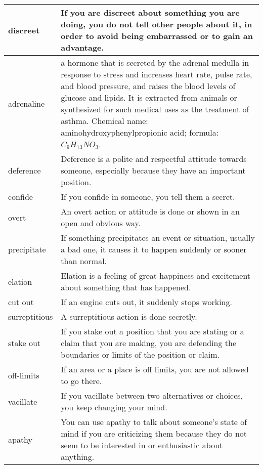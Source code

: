 \documentclass{article}
\begin{document}
\begin{center}
\begin{longtable}{|l|p{9cm}|}
\hline
discreet
&
If you are discreet about something you are doing, you do not tell other people about it, in order to avoid being embarrassed or to gain an advantage.
\\

\hline
adrenaline
&
a hormone that is secreted by the adrenal medulla in response to stress and increases heart rate, pulse rate, and blood pressure, and raises the blood levels of glucose and lipids. It is extracted from animals or synthesized for such medical uses as the treatment of asthma. Chemical name: aminohydroxyphenylpropionic acid; formula: $C_{9}H_{13}NO_{3}$.
\\

\hline
deference
&
Deference is a polite and respectful attitude towards someone, especially because they have an important position.
\\

\hline
confide
&
If you confide in someone, you tell them a secret.
\\

\hline
overt
&
An overt action or attitude is done or shown in an open and obvious way.
\\

\hline
precipitate
&
If something precipitates an event or situation, usually a bad one, it causes it to happen suddenly or sooner than normal.
\\

\hline
elation
&
Elation is a feeling of great happiness and excitement about something that has happened.
\\

\hline
cut out
&
If an engine cuts out, it suddenly stops working.
\\

\hline
surreptitious
&
A surreptitious action is done secretly.
\\

\hline
stake out
&
If you stake out a position that you are stating or a claim that you are making, you are defending the boundaries or limits of the position or claim.
\\

\hline
off-limits
&
If an area or a place is off limits, you are not allowed to go there.
\\

\hline
vacillate
&
If you vacillate between two alternatives or choices, you keep changing your mind.
\\

\hline
apathy
&
You can use apathy to talk about someone's state of mind if you are criticizing them because they do not seem to be interested in or enthusiastic about anything.
\\


\end{longtable}
\end{center}
\end{document}
